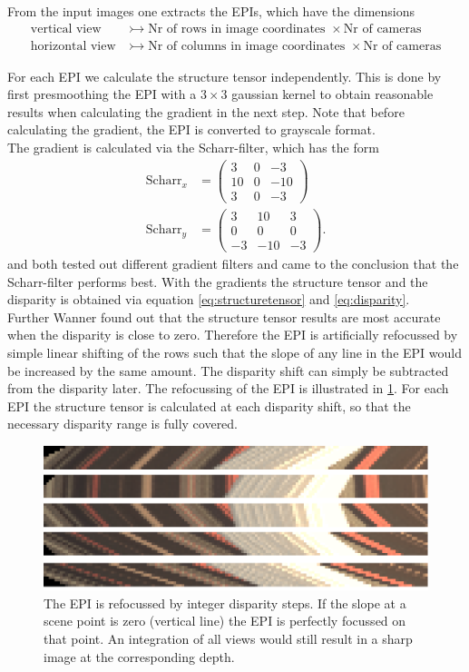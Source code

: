 \documentclass  [
  paper    = a4,
  BCOR     = 10mm,
  twoside,
  fontsize = 12pt,
  fleqn,
  toc      = bibnumbered,
  toc      = listofnumbered,
  numbers  = noendperiod,
  headings = normal,
  listof   = leveldown,
  version  = 3.03
]                                       {scrreprt}
\begin{document}
 From the input images one extracts the EPIs, which have the dimensions
 \begin{align*}
 \text{vertical view}&\rightarrowtail \text{Nr of rows in image coordinates }\times \text{Nr of cameras}\\
 \text{horizontal view}&\rightarrowtail \text{Nr of columns in image coordinates }\times \text{Nr of cameras}
 \end{align*}
 
 For each EPI we calculate the structure tensor independently. This is done by first presmoothing the EPI with a $3\times3$ gaussian kernel to obtain reasonable results when calculating the gradient in the next step. Note that before calculating the gradient, the EPI is converted to grayscale format.\\
 The gradient is calculated via the Scharr-filter, which has the form
 \begin{align}\label{key}
 \text{Scharr}_x &= \left(\begin{matrix}
 3&0&-3\\
 10&0&-10\\
 3&0&-3
 \end{matrix}\right)
\\
 \text{Scharr}_y &= \left(\begin{matrix}
 3&10&3\\
 0&0&0\\
 -3&-10&-3
 \end{matrix}\right).
 \end{align}
 \cite{wanner2014orientation} and \cite{diebold2016light} both tested out different gradient filters and came to the conclusion that the Scharr-filter performs best. With the gradients the structure tensor and the disparity is obtained via equation \ref{eq:structuretensor} and \ref{eq:disparity}.\\
 Further Wanner found out that the structure tensor results are most accurate when the disparity is close to zero. Therefore the EPI is artificially refocussed by simple linear shifting of the rows such that the slope of any line in the EPI would be increased by the same amount. The disparity shift can simply be subtracted from the disparity later. The refocussing of the EPI is illustrated in \ref{fig:refocusedcut}. For each EPI the structure tensor is calculated at each disparity shift, so that the necessary disparity range is fully covered.  \\
 \begin{figure}
 	\centering
 	\includegraphics[width=0.7\linewidth]{images/refocused_cut}
 	\caption[Refocussed EPI]{The EPI is refocussed by integer disparity steps. If the slope at a scene point is zero (vertical line) the EPI is perfectly focussed on that point. An integration of all views would still result in a sharp image at the corresponding depth.}
 	\label{fig:refocusedcut}
 \end{figure}
 
\end{document}
